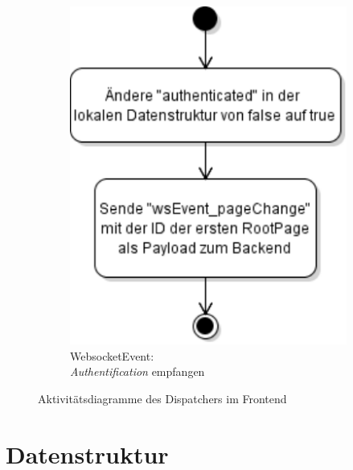 \begin{figure}[ht]
\begin{subfigure}[b]{0.30\textwidth}
      \includegraphics[width=\textwidth]{content/hauptteil/systemEntwurf/res/wsHandler/frontend/wsEvent_authentification.pdf}
      \caption{WebsocketEvent:\\\emph{Authentification} empfangen}
      \label{fig:aDDF:wsEvent_authentification}
  \end{subfigure}
     \caption[Aktivitätsdiagramme Dispatcher Frontend]{Aktivitätsdiagramme des Dispatchers im Frontend}
     \label{fig:activityDiagramDispatcherFrontend}
\end{figure}

\section{Datenstruktur}
